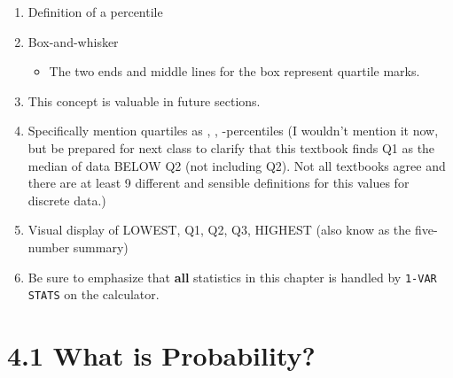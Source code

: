 \documentclass{article}
\begin{document}
\begin{enumerate}

    \item Definition of a percentile

    \item Box-and-whisker
    
        \begin{itemize}
        
        \item The two ends and middle lines for the box represent quartile marks.
        
        \end{itemize}

    \item This concept is valuable in future sections.

    \item Specifically mention quartiles as , , -percentiles (I wouldn’t mention it now, but be prepared for next class to clarify that this textbook finds Q1 as the median of data BELOW Q2 (not including Q2).  Not all textbooks agree and there are at least 9 different and sensible definitions for this values for discrete data.)

    \item Visual display of LOWEST, Q1, Q2, Q3, HIGHEST (also know as the five-number summary)
    
    \item Be sure to emphasize that {\bf all} statistics in this chapter is handled by \texttt{1-VAR STATS} on the calculator.
    
\end{enumerate}

\section*{4.1 What is Probability?}
\end{document}
